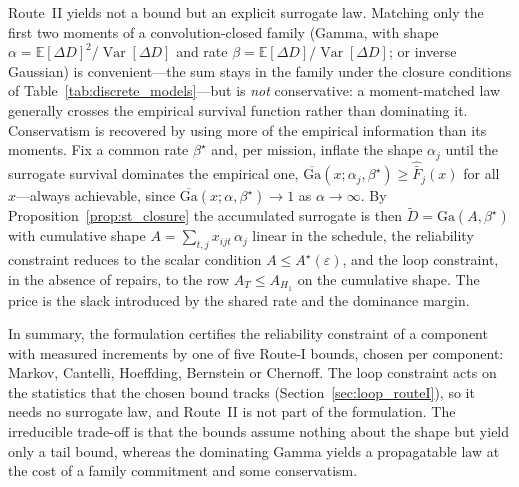 \documentclass[11pt,a4paper]{article}
\theoremstyle{plain}
\theoremstyle{definition}
\theoremstyle{remark}
\begin{document}
Route~II yields not a bound but an explicit surrogate law.
Matching only the first two moments of a convolution-closed family (Gamma, with shape $\alpha = \mathbb{E}[\Delta D]^2/\operatorname{Var}[\Delta D]$ and rate $\beta = \mathbb{E}[\Delta D]/\operatorname{Var}[\Delta D]$; or inverse Gaussian) is convenient---the sum stays in the family under the closure conditions of Table~\ref{tab:discrete_models}---but is \emph{not} conservative: a moment-matched law generally crosses the empirical survival function rather than dominating it.
Conservatism is recovered by using more of the empirical information than its moments.
Fix a common rate $\beta^\star$ and, per mission, inflate the shape $\alpha_j$ until the surrogate survival dominates the empirical one, $\overline{\mathrm{Ga}}(x;\alpha_j,\beta^\star) \ge \widehat{\bar F}_j(x)$ for all $x$---always achievable, since $\overline{\mathrm{Ga}}(x;\alpha,\beta^\star) \to 1$ as $\alpha \to \infty$.
By Proposition~\ref{prop:st_closure} the accumulated surrogate is then $\widetilde{D} = \mathrm{Ga}(A,\beta^\star)$ with cumulative shape $A = \sum_{t,j} x_{ijt}\,\alpha_j$ linear in the schedule, the reliability constraint reduces to the scalar condition $A \le A^\star(\varepsilon)$, and the loop constraint, in the absence of repairs, to the row $A_T \le A_{H_1}$ on the cumulative shape.
The price is the slack introduced by the shared rate and the dominance margin.

In summary, the formulation certifies the reliability constraint of a component with measured increments by one of five Route-I bounds, chosen per component: Markov, Cantelli, Hoeffding, Bernstein or Chernoff.
The loop constraint acts on the statistics that the chosen bound tracks (Section~\ref{sec:loop_routeI}), so it needs no surrogate law, and Route~II is not part of the formulation.
The irreducible trade-off is that the bounds assume nothing about the shape but yield only a tail bound, whereas the dominating Gamma yields a propagatable law at the cost of a family commitment and some conservatism.
\end{document}
